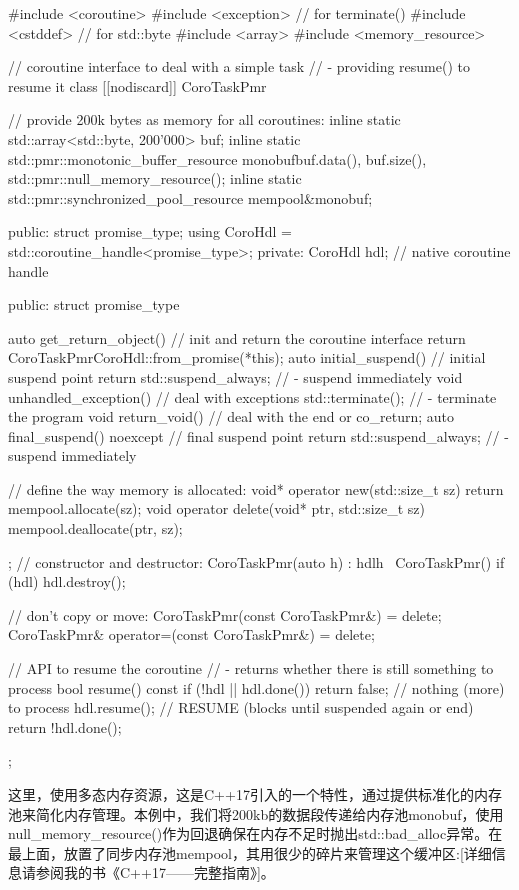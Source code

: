 \begin{cpp}
#include <coroutine>
#include <exception> // for terminate()
#include <cstddef> // for std::byte
#include <array>
#include <memory_resource>

// coroutine interface to deal with a simple task
// - providing resume() to resume it
class [[nodiscard]] CoroTaskPmr {
	// provide 200k bytes as memory for all coroutines:
	inline static std::array<std::byte, 200'000> buf;
	inline static std::pmr::monotonic_buffer_resource
		monobuf{buf.data(), buf.size(), std::pmr::null_memory_resource()};
	inline static std::pmr::synchronized_pool_resource mempool{&monobuf};

public:
	struct promise_type;
	using CoroHdl = std::coroutine_handle<promise_type>;
private:
	CoroHdl hdl; // native coroutine handle

public:
	struct promise_type {
		auto get_return_object() { // init and return the coroutine interface
			return CoroTaskPmr{CoroHdl::from_promise(*this)};
		}
		auto initial_suspend() { // initial suspend point
			return std::suspend_always{}; // - suspend immediately
		}
		void unhandled_exception() { // deal with exceptions
			std::terminate(); // - terminate the program
		}
		void return_void() { // deal with the end or co_return;
		}
		auto final_suspend() noexcept { // final suspend point
			return std::suspend_always{}; // - suspend immediately
		}

		// define the way memory is allocated:
		void* operator new(std::size_t sz) {
			return mempool.allocate(sz);
		}
		void operator delete(void* ptr, std::size_t sz) {
			mempool.deallocate(ptr, sz);
		}
	};
	// constructor and destructor:
	CoroTaskPmr(auto h) : hdl{h} { }
	~CoroTaskPmr() { if (hdl) hdl.destroy(); }

	// don’t copy or move:
	CoroTaskPmr(const CoroTaskPmr&) = delete;
	CoroTaskPmr& operator=(const CoroTaskPmr&) = delete;

	// API to resume the coroutine
	// - returns whether there is still something to process
	bool resume() const {
		if (!hdl || hdl.done()) {
			return false; // nothing (more) to process
		}
		hdl.resume(); // RESUME (blocks until suspended again or end)
		return !hdl.done();
	}
};
\end{cpp}

这里，使用多态内存资源，这是C++17引入的一个特性，通过提供标准化的内存池来简化内存管理。本例中，我们将200kb的数据段传递给内存池monobuf，使用null\_memory\_resource()作为回退确保在内存不足时抛出std::bad\_alloc异常。在最上面，放置了同步内存池mempool，其用很少的碎片来管理这个缓冲区:[详细信息请参阅我的书《C++17——完整指南》]。


